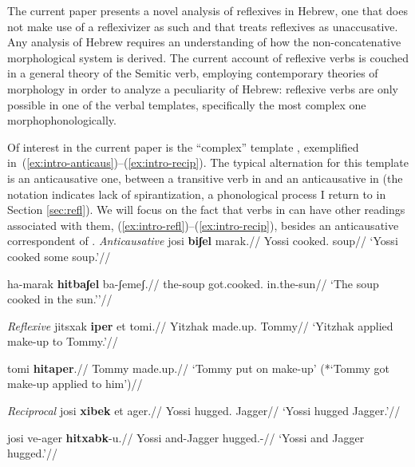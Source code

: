 The current paper presents a novel analysis of reflexives in Hebrew, one that does not make use of a reflexivizer as such and that treats reflexives as unaccusative. Any analysis of Hebrew requires an understanding of how the non-concatenative morphological system is derived. The current account of reflexive verbs is couched in a general theory of the Semitic verb, employing contemporary theories of morphology in order to analyze a peculiarity of Hebrew: reflexive verbs are only possible in one of the verbal templates, specifically the most complex one morphophonologically.


Of interest in the current paper is the ``complex'' template {\thit}, exemplified in~(\ref{ex:intro-anticaus})--(\ref{ex:intro-recip}). The typical alternation for this template is an anticausative one, between a transitive verb in {\tpie} and an anticausative in {\thit} (the notation  indicates lack of spirantization, a phonological process I return to in Section \ref{sec:refl}). We will focus on the fact that verbs in {\thit} can have other readings associated with them, (\ref{ex:intro-refl})--(\ref{ex:intro-recip}), besides an anticausative correspondent of {\tpie}.
\pex\label{ex:intro-anticaus}\textit{Anticausative}
	\a \begingl
		\gla josi \textbf{biʃel} marak.//
		\glb Yossi cooked. soup//
		\glft `Yossi cooked some soup.'//
	\endgl
	
	\a \begingl
		\gla ha-marak \textbf{hitbaʃel} ba-ʃemeʃ.//
		\glb the-soup got.cooked. in.the-sun//
		\glft `The soup cooked in the sun.''//
	\endgl
\xe

\pex\label{ex:intro-refl}\textit{Reflexive}
	\a \begingl
		\gla jitsxak \textbf{iper} et tomi.//
		\glb Yitzhak made.up.  Tommy//
		\glft `Yitzhak applied make-up to Tommy.'//
	\endgl
	
	\a \begingl
		\gla tomi \textbf{hitaper}.//
		\glb Tommy made.up.//
		\glft `Tommy put on make-up' (*`Tommy got make-up applied to him')//
	\endgl
\xe

\pex\label{ex:intro-recip}\textit{Reciprocal}
	\a \begingl
		\gla josi \textbf{xibek} et {\textdyoghlig}ager.//
		\glb Yossi hugged.  Jagger//
		\glft `Yossi hugged Jagger.'//
	\endgl
	
	\a \begingl
		\gla josi ve-{\textdyoghlig}ager \textbf{hitxabk}-u.//
		\glb Yossi and-Jagger hugged.-//
		\glft `Yossi and Jagger hugged.'//
	\endgl
\xe

